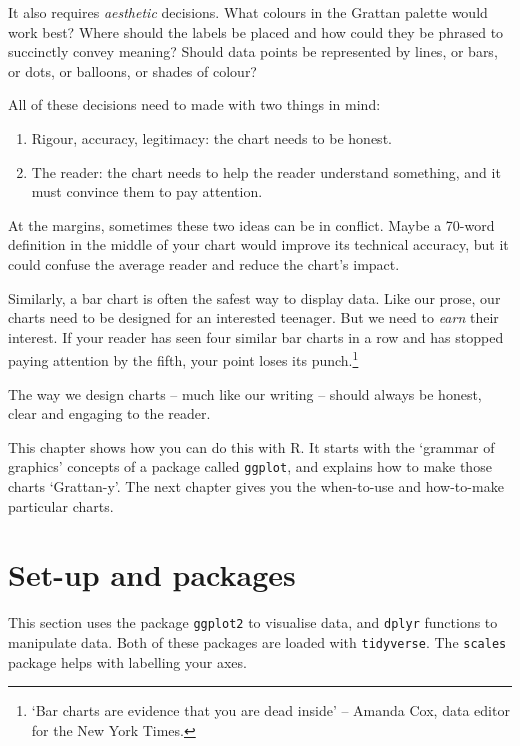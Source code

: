 \documentclass[]{book}
\providecommand{\tightlist}{%
  \setlength{\itemsep}{0pt}\setlength{\parskip}{0pt}}
\begin{document}
It also requires \emph{aesthetic} decisions. What colours in the Grattan palette would work best? Where should the labels be placed and how could they be phrased to succinctly convey meaning? Should data points be represented by lines, or bars, or dots, or balloons, or shades of colour?

All of these decisions need to made with two things in mind:

\begin{enumerate}
\def\labelenumi{\arabic{enumi}.}
\tightlist
\item
  Rigour, accuracy, legitimacy: the chart needs to be honest.
\item
  The reader: the chart needs to help the reader understand something, and it must convince them to pay attention.
\end{enumerate}

At the margins, sometimes these two ideas can be in conflict. Maybe a 70-word definition in the middle of your chart would improve its technical accuracy, but it could confuse the average reader and reduce the chart's impact.

Similarly, a bar chart is often the safest way to display data. Like our prose, our charts need to be designed for an interested teenager. But we need to \emph{earn} their interest. If your reader has seen four similar bar charts in a row and has stopped paying attention by the fifth, your point loses its punch.\footnote{`Bar charts are evidence that you are dead inside' -- Amanda Cox, data editor for the New York Times.}

The way we design charts -- much like our writing -- should always be honest, clear and engaging to the reader.

This chapter shows how you can do this with R. It starts with the `grammar of graphics' concepts of a package called \texttt{ggplot}, and explains how to make those charts `Grattan-y'. The next chapter gives you the when-to-use and how-to-make particular charts.

\hypertarget{set-up-and-packages}{%
\section{Set-up and packages}\label{set-up-and-packages}}

This section uses the package \texttt{ggplot2} to visualise data, and \texttt{dplyr} functions to manipulate data. Both of these packages are loaded with \texttt{tidyverse}. The \texttt{scales} package helps with labelling your axes.
\end{document}
